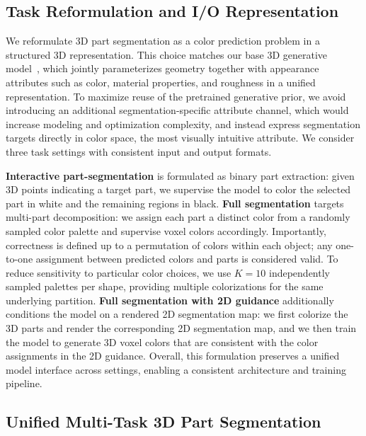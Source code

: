 \subsection{Task Reformulation and I/O Representation}
\label{sec:task_define}

We reformulate 3D part segmentation as a color prediction problem in a structured 3D representation.
%
This choice matches our base 3D generative model~\cite{trellis2}, which jointly parameterizes geometry together with appearance attributes such as color, material properties, and roughness in a unified representation.
%
To maximize reuse of the pretrained generative prior, 
we avoid introducing an additional segmentation-specific attribute channel, which would increase modeling and optimization complexity, and instead express segmentation targets directly in color space, the most visually intuitive attribute.
We consider three task settings with consistent input and output formats.

%
\textbf{Interactive part-segmentation} is formulated as binary part extraction: given 3D points indicating a target part, we supervise the model to color the selected part in white and the remaining regions in black.
%
\textbf{Full segmentation} targets multi-part decomposition: we assign each part a distinct color from a randomly sampled color palette and supervise voxel colors accordingly.
%
Importantly, correctness is defined up to a permutation of colors within each object; any one-to-one assignment between predicted colors and parts is considered valid.
%
To reduce sensitivity to particular color choices, we use $K{=}10$ independently sampled palettes per shape, providing multiple colorizations for the same underlying partition.
%
\textbf{Full segmentation with 2D guidance} additionally conditions the model on a rendered 2D segmentation map: we first colorize the 3D parts and render the corresponding 2D segmentation map, and we then train the model to generate 3D voxel colors that are consistent with the color assignments in the 2D guidance.
%
Overall, this formulation preserves a unified model interface across settings, enabling a consistent architecture and training pipeline.


\subsection{Unified Multi-Task 3D Part Segmentation}
\label{sec:pipeline}

